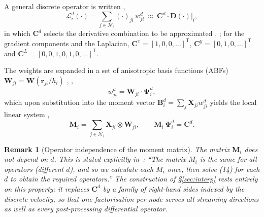\documentclass[11pt,a4paper]{article}
\newcommand{\rji}{\bm{r}_{ji}}
\newtheorem{remark}{Remark}
\begin{document}
A general discrete operator is written \cite[Eq.~(4)]{KLN2020},
\cite[Eq.~(3)]{KL2021}
\begin{equation}
\mathcal L^{d}_i(\cdot)=\sum_{j\in\mathcal N_i}(\cdot)_{ji}\,w^{d}_{ji}
\ \approx\ \bm C^{d}\cdot\bm D(\cdot)\big|_i ,
\label{eq:Lop}
\end{equation}
in which $\bm C^{d}$ selects the derivative combination to be approximated
\cite[Eq.~(5)]{KLN2020}, \cite[Eq.~(4)]{KL2021}; for the gradient components and the
Laplacian, $\bm C^{x}=[1,0,0,\dots]^{\mathsf T}$, $\bm C^{y}=[0,1,0,\dots]^{\mathsf T}$
and $\bm C^{L}=[0,0,1,0,1,0,\dots]^{\mathsf T}$.

The weights are expanded in a set of anisotropic basis functions (ABFs)
$\bm W_{ji}=\bm W(\rji/h_i)$ \cite[Eq.~(10)]{KLN2020}, \cite[Eq.~(5)]{KL2021},
\begin{equation}
w^{d}_{ji}=\bm W_{ji}\cdot\bm\Psi^{d}_i ,
\label{eq:wPsi}
\end{equation}
which upon substitution into the moment vector $\bm B^d_i=\sum_j\bm X_{ji}w^d_{ji}$
\cite[Eq.~(8)]{KLN2020} yields the local linear system
\cite[Eqs.~(13),(14)]{KLN2020}, \cite[Eqs.~(6),(7)]{KL2021}
\begin{equation}
\bm M_i=\sum_{j\in\mathcal N_i}\bm X_{ji}\otimes\bm W_{ji},
\qquad
\bm M_i\,\bm\Psi^{d}_i=\bm C^{d}.
\label{eq:moments}
\end{equation}

\begin{remark}[Operator independence of the moment matrix]
\label{rem:shared}
The matrix $\bm M_i$ does not depend on $d$. This is stated explicitly
in~\cite[\S 3.1]{KLN2020}: ``The matrix $M_i$ is the same for all operators
(different $d$), and so we calculate each $M_i$ once, then solve (14) for each $d$ to
obtain the required operators.'' The construction of \S\ref{sec:interp} rests entirely
on this property: it replaces $\bm C^d$ by a family of right-hand sides indexed by the
discrete velocity, so that one factorisation per node serves all streaming directions
as well as every post-processing differential operator.
\end{remark}
\end{document}
